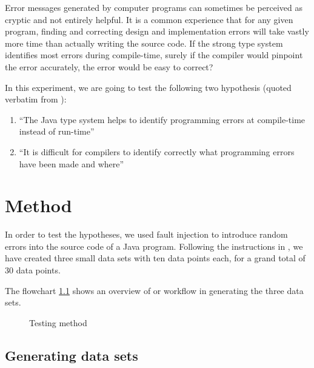 \documentclass[10pt]{report}
\begin{document}
Error messages generated by computer programs can sometimes be perceived as cryptic and not entirely helpful.  It is a common experience that for any given program, finding and correcting design and implementation errors will take vastly more time than actually writing the source code.  If the strong type system identifies most errors during compile-time, surely if the compiler would pinpoint the error accurately, the error would be easy to correct?

In this experiment, we are going to test the following two hypothesis (quoted verbatim from \cite[p1]{bradley}):

\begin{enumerate}
    \item ``The Java type system helps to identify programming errors at compile-time instead of run-time''
    \item ``It is difficult for compilers to identify correctly what programming errors have been made and where''
\end{enumerate}

\chapter{Method}
\thispagestyle{fancy}

In order to test the hypotheses, we used fault injection \cite[p1]{bradley} to introduce random errors into the source code of a Java program.   Following the instructions in \cite{bradley}, we have created three small data sets with ten data points each, for a grand total of 30 data points.

The flowchart \ref{flowchart} shows an overview of or workflow in generating the three data sets.

\begin{figure}[p]
    \centering
    \caption{Testing method}
    \label{flowchart}
\end{figure}


\section{Generating data sets}
\end{document}
